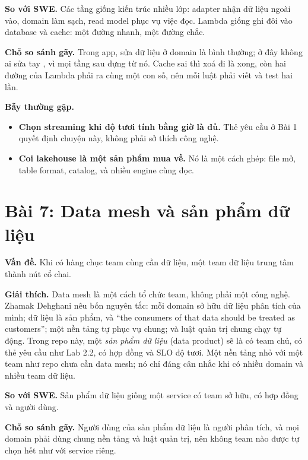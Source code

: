 \begin{ghichu}
\textbf{So với SWE.} Các tầng giống kiến trúc nhiều lớp: adapter nhận dữ liệu ngoài vào, domain làm sạch, read model phục vụ việc đọc. Lambda giống ghi đôi vào database và cache: một đường nhanh, một đường chắc.

\textbf{Chỗ so sánh gãy.} Trong app, sửa dữ liệu ở domain là bình thường; ở đây không ai sửa tay , vì mọi tầng sau dựng từ nó. Cache sai thì xoá đi là xong, còn hai đường của Lambda phải ra cùng một con số, nên mỗi luật phải viết và test hai lần.
\end{ghichu}

\begin{luuy}
\textbf{Bẫy thường gặp.}
\begin{itemize}
  \item \textbf{Chọn streaming khi độ tươi tính bằng giờ là đủ.} Thẻ yêu cầu ở Bài 1 quyết định chuyện này, không phải sở thích công nghệ.
  \item \textbf{Coi lakehouse là một sản phẩm mua về.} Nó là một cách ghép: file mở, table format, catalog, và nhiều engine cùng đọc.
\end{itemize}
\end{luuy}

\section{Bài 7: Data mesh và sản phẩm dữ liệu}

\textbf{Vấn đề.} Khi có hàng chục team cùng cần dữ liệu, một team dữ liệu trung tâm thành nút cổ chai.

\textbf{Giải thích.} Data mesh là một cách tổ chức team, không phải một công nghệ. Zhamak Dehghani nêu bốn nguyên tắc: mỗi domain sở hữu dữ liệu phân tích của mình; dữ liệu là sản phẩm, và ``the consumers of that data should be treated as customers''; một nền tảng tự phục vụ chung; và luật quản trị chung chạy tự động. Trong repo này, một \textit{sản phẩm dữ liệu} (data product) sẽ là  có team chủ, có thẻ yêu cầu như Lab 2.2, có hợp đồng và SLO độ tươi. Một nền tảng nhỏ với một team như repo chưa cần data mesh; nó chỉ đáng cân nhắc khi có nhiều domain và nhiều team dữ liệu.

\begin{ghichu}
\textbf{So với SWE.} Sản phẩm dữ liệu giống một service có team sở hữu, có hợp đồng và người dùng.

\textbf{Chỗ so sánh gãy.} Người dùng của sản phẩm dữ liệu là người phân tích, và mọi domain phải dùng chung nền tảng và luật quản trị, nên không team nào được tự chọn hết như với service riêng.
\end{ghichu}

